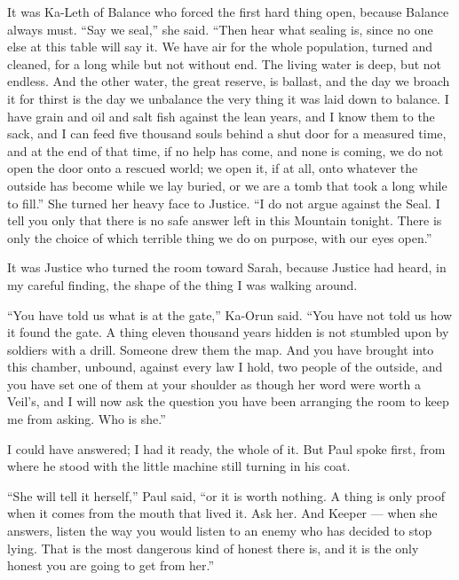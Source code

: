 It was Ka-Leth of Balance who forced the first hard thing open, because Balance always must. ``Say we seal,'' she said. ``Then hear what sealing is, since no one else at this table will say it. We have air for the whole population, turned and cleaned, for a long while but not without end. The living water is deep, but not endless. And the other water, the great reserve, is ballast, and the day we broach it for thirst is the day we unbalance the very thing it was laid down to balance. I have grain and oil and salt fish against the lean years, and I know them to the sack, and I can feed five thousand souls behind a shut door for a measured time, and at the end of that time, if no help has come, and none is coming, we do not open the door onto a rescued world; we open it, if at all, onto whatever the outside has become while we lay buried, or we are a tomb that took a long while to fill.'' She turned her heavy face to Justice. ``I do not argue against the Seal. I tell you only that there is no safe answer left in this Mountain tonight. There is only the choice of which terrible thing we do on purpose, with our eyes open.''\par

\ornament

It was Justice who turned the room toward Sarah, because Justice had heard, in my careful finding, the shape of the thing I was walking around.\par

``You have told us what is at the gate,'' Ka-Orun said. ``You have not told us how it found the gate. A thing eleven thousand years hidden is not stumbled upon by soldiers with a drill. Someone drew them the map. And you have brought into this chamber, unbound, against every law I hold, two people of the outside, and you have set one of them at your shoulder as though her word were worth a Veil's, and I will now ask the question you have been arranging the room to keep me from asking. Who is she.''\par

I could have answered; I had it ready, the whole of it. But Paul spoke first, from where he stood with the little machine still turning in his coat.\par

``She will tell it herself,'' Paul said, ``or it is worth nothing. A thing is only proof when it comes from the mouth that lived it. Ask her. And Keeper --- when she answers, listen the way you would listen to an enemy who has decided to stop lying. That is the most dangerous kind of honest there is, and it is the only honest you are going to get from her.''\par

